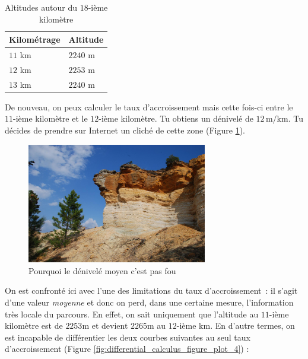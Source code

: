\begin{table}[H]
\centering
\begin{tabular}{|p{10cm}|p{4cm}|}
    \hline
    Kilométrage & Altitude \\
    \hline

    $11$ km & $2240$ m \\
    $12$ km & $2253$ m \\
    $13$ km & $2240$ m \\
    
    \hline
\end{tabular}
\caption{Altitudes autour du $18$-ième kilomètre}
\label{fig:differential_calculus_ex_table_2}
\end{table}

De nouveau, on peux calculer le taux d'accroissement mais cette fois-ci entre le $11$-ième kilomètre et le $12$-ième kilomètre. Tu obtiens un dénivelé de $12\,\textrm{m}/\textrm{km}$. Tu décides de prendre sur Internet un cliché de cette zone (Figure \ref{fig:differential_calculus_ex_table_3}).

\begin{figure}[H]
    \centering
    \includegraphics[width=0.7\textwidth]{assets/imgs/banniere-0331.jpg}
    \caption{Pourquoi le dénivelé moyen c'est pas fou}
    \label{fig:differential_calculus_ex_table_3}
\end{figure}

On est confronté ici avec l'une des limitations du taux d'accroissement~: il s'agit d'une valeur \emph{moyenne} et donc on perd, dans une certaine mesure, l'information très locale du parcours. En effet, on sait uniquement que l'altitude au $11$-ième kilomètre est de $2253$m et devient $2265$m au $12$-ième km. En d'autre termes, on est incapable de différentier les deux courbes suivantes au seul taux d'accroissement (Figure \ref{fig:differential_calculus_figure_plot_4}) :


